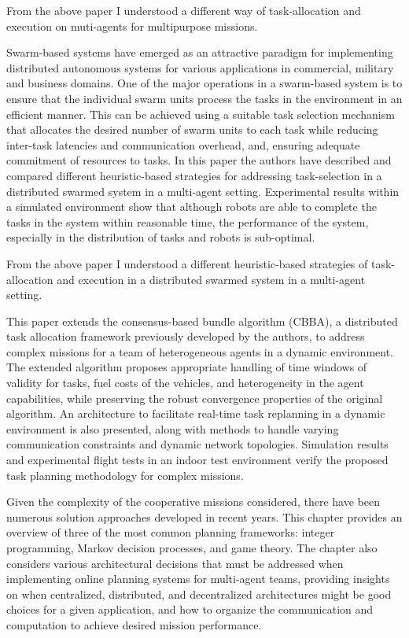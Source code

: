 \documentclass[conference]{IEEEtran}
\begin{document}
From the above paper I understood a different way of task-allocation and execution on muti-agents for multipurpose missions.

Swarm-based systems have emerged as an attractive paradigm for implementing distributed autonomous systems for various applications in commercial, military and business domains. One of the major operations in a swarm-based system is to ensure that the individual swarm units process the tasks in the environment in an efficient manner. This can be achieved using a suitable task selection mechanism that allocates the desired number of swarm units to each task while reducing inter-task latencies and communication overhead, and, ensuring adequate commitment of resources to tasks. In this paper the authors have described and compared different heuristic-based strategies for addressing task-selection in a distributed swarmed system in a multi-agent setting. Experimental results within a simulated environment show that although robots are able to complete the tasks in the system within reasonable time, the performance of the system, especially in the distribution of tasks and robots is sub-optimal\cite{miller2006distributed}.

From the above paper I understood a different heuristic-based strategies of task-allocation and execution in a distributed swarmed system in a multi-agent setting.

This paper extends the consensus-based bundle algorithm (CBBA), a distributed task allocation framework previously developed by the authors, to address complex missions for a team of heterogeneous agents in a dynamic environment. The extended algorithm proposes appropriate handling of time windows of validity for tasks, fuel costs of the vehicles, and heterogeneity in the agent capabilities, while preserving the robust convergence properties of the original algorithm. An architecture to facilitate real-time task replanning in a dynamic environment is also presented, along with methods to handle varying communication constraints and dynamic network topologies. Simulation results and experimental flight tests in an indoor test environment verify the proposed task planning methodology for complex missions\cite{ponda2010decentralized}.

\cite{ponda2015cooperative}Given the complexity of the cooperative missions considered, there have been numerous solution approaches developed in recent years. This chapter provides an overview of three of the most common planning frameworks: integer programming, Markov decision processes, and game theory. The chapter also considers various architectural decisions that must be addressed when implementing online planning systems for multi-agent teams, providing insights on when centralized, distributed, and decentralized architectures might be good choices for a given application, and how to organize the communication and computation to achieve desired mission performance.
\end{document}
